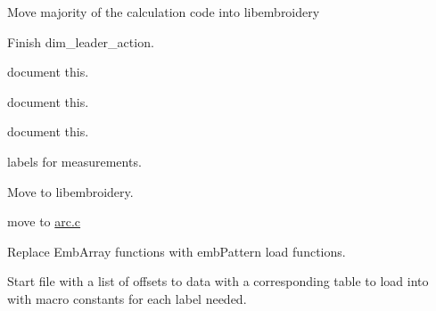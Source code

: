 \begin{DoxyRefList}
\label{todo__todo000027}%
%
Move majority of the calculation code into libembroidery 
\item[Member \mbox{\hyperlink{imgui__main_8c_afa6e9c56ed9f01289bfe44c7551ba583}{dim\+\_\+leader\+\_\+action}} (void)]\label{todo__todo000193}%
%
Finish dim\+\_\+leader\+\_\+action.  
\item[Member \mbox{\hyperlink{imgui__main_8c_af0780bc626b0edd93a5323210a85ab58}{disable\+\_\+move\+\_\+rapid\+\_\+fire}} (void)]\label{todo__todo000040}%
%
document this.  
\item[Member \mbox{\hyperlink{imgui__main_8c_a4c786f303137470eabb4db685c64d56a}{disable\+Prompt\+Rapid\+Fire}} (void)]\label{todo__todo000180}%
%
document this.  
\item[Member \mbox{\hyperlink{imgui__main_8c_ad0ea9b475e8aa2c58004ebc6bf95df1d}{draw\+\_\+grid}} (void)]\label{todo__todo000080}%
%
document this.  
\item[Member \mbox{\hyperlink{imgui__main_8c_a1d1368160b5595cf6796e81b5ee3cb43}{draw\+\_\+rulers}} (void)]\label{todo__todo000079}%
%
labels for measurements.  
\item[Member \mbox{\hyperlink{imgui__main_8c_a1291ffefd4b741c0b342ed03934c431d}{emb\+\_\+clamp}} (Emb\+Real lower, Emb\+Real x, Emb\+Real upper)]\label{todo__todo000009}%
%
Move to libembroidery.  
\item[Member \mbox{\hyperlink{main_8c_a16e1e46c5c33874fc9a63476e70c0d66}{emb\+Arc\+\_\+print}} (Emb\+Arc arc)]\label{todo__todo000413}%
%
move to \mbox{\hyperlink{arc_8c}{arc.\+c}}  
\item[Page \mbox{\hyperlink{md_extern_libembroidery_src_embedded}{embedded}} ]\label{todo__todo000387}%
%
Replace Emb\+Array functions with emb\+Pattern load functions.

\label{todo__todo000388}%
%
Start file with a list of offsets to data with a corresponding table to load into with macro constants for each label needed.


\end{DoxyRefList}
